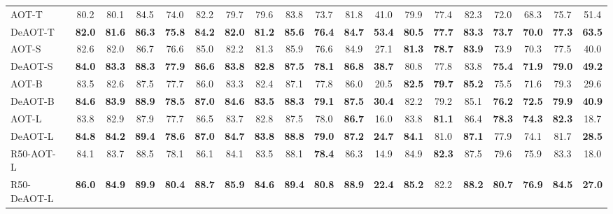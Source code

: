 \documentclass{article}
\begin{document}
\begin{table}[t!]
\begin{tabular}{l|ccccc|ccccc|c|ccc|ccc|c}
\hline
\hline
AOT-T~\cite{aot} & 80.2  &  80.1  & 84.5  & 74.0  & 82.2  &  79.7  &  79.6  & 83.8  & 73.7  & 81.8 & {41.0}   & 79.9 & 77.4 & 82.3  & 72.0 & 68.3 & 75.7 & {51.4} \\
DeAOT-T & \textbf{82.0}  &  \textbf{81.6}  & \textbf{86.3}  & \textbf{75.8}  & \textbf{84.2}  & \textbf{82.0}  &  \textbf{81.2}  & \textbf{85.6}  & \textbf{76.4}  & \textbf{84.7} & \textbf{53.4}  & \textbf{80.5} & \textbf{77.7} & \textbf{83.3}  & \textbf{73.7} & \textbf{70.0} & \textbf{77.3} & \textbf{63.5} \\
\hline
AOT-S~\cite{aot}  & 82.6  &  82.0  & 86.7  & 76.6  & 85.0  &  82.2 &  81.3  & 85.9  & 76.6  & 84.9 & {27.1}  & \textbf{81.3} & \textbf{78.7} & \textbf{83.9}  &  73.9  & 70.3 & 77.5 & 40.0  \\
DeAOT-S & \textbf{84.0}  &  \textbf{83.3}  & \textbf{88.3}  & \textbf{77.9}  & \textbf{86.6}  & \textbf{83.8}  &  \textbf{82.8}  & \textbf{87.5}  & \textbf{78.1}  & \textbf{86.8} & \textbf{38.7}  & {80.8} & {77.8} & {83.8}  & \textbf{75.4} & \textbf{71.9} & \textbf{79.0} & \textbf{49.2} \\
\hline
AOT-B~\cite{aot}  & 83.5  &  {82.6}  & 87.5  & {77.7}  & 86.0  &  83.3 &  {82.4}  & {87.1}  & 77.8  & 86.0 & 20.5  & \textbf{82.5} & \textbf{79.7} & \textbf{85.2}   &  75.5  & 71.6 & 79.3 & 29.6  \\
DeAOT-B & \textbf{84.6}  &  \textbf{83.9}  & \textbf{88.9}  & \textbf{78.5}  & \textbf{87.0}  & \textbf{84.6}  &  \textbf{83.5}  & \textbf{88.3}  & \textbf{79.1}  & \textbf{87.5} & \textbf{30.4}  & {82.2} & {79.2} & {85.1}  & \textbf{76.2} & \textbf{72.5} & \textbf{79.9} & \textbf{40.9} \\
\hline
AOT-L~\cite{aot}  & {83.8}  &  {82.9}  & {87.9}  & {77.7}  & {86.5}  &  {83.7} &  {82.8}  & {87.5}  & {78.0}  & \textbf{86.7} & 16.0  & {83.8} & \textbf{81.1} & {86.4}   &  \textbf{78.3}  & \textbf{74.3} & \textbf{82.3} & 18.7 \\
DeAOT-L & \textbf{84.8}  &  \textbf{84.2}  & \textbf{89.4}  & \textbf{78.6}  & \textbf{87.0}  & \textbf{84.7}  &  \textbf{83.8}  & \textbf{88.8}  & \textbf{79.0}  & \textbf{87.2} & \textbf{24.7}  & \textbf{84.1} & {81.0} & \textbf{87.1}   & {77.9} & {74.1} & {81.7} & \textbf{28.5}  \\
\hline
R50-AOT-L~\cite{aot}  & {84.1}  &  {83.7}  & {88.5}  & {78.1}  & {86.1}  & {84.1}  &  {83.5}  & {88.1}  & \textbf{78.4}  & {86.3} & 14.9  & {84.9} & \textbf{82.3} & {87.5}  & {79.6} & {75.9} & {83.3} & 18.0 \\
R50-DeAOT-L & \textbf{86.0}  &  \textbf{84.9}  & \textbf{89.9}  & \textbf{80.4}  & \textbf{88.7}  & \textbf{85.9}  &  \textbf{84.6}  & \textbf{89.4}  & \textbf{80.8}  & \textbf{88.9} & \textbf{22.4}  & \textbf{85.2} & {82.2} & \textbf{88.2}  & \textbf{80.7} & \textbf{76.9} & \textbf{84.5} & \textbf{27.0} \\

\end{tabular}
\end{table}
\end{document}
